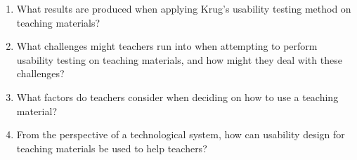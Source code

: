 \begin{enumerate}
	\item What results are produced when applying Krug's usability testing method on teaching materials?
	\item What challenges might teachers run into when attempting to perform usability testing on teaching materials, and how might they deal with these challenges?
	\item What factors do teachers consider when deciding on how to use a teaching material?
	\item From the perspective of a technological system, how can usability design for teaching materials be used to help teachers?
\end{enumerate}

